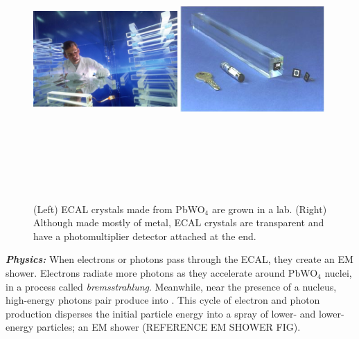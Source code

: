 \begin{figure}[pbth]
    \centering
    \includegraphics[width=0.49\textwidth,height=10cm,keepaspectratio]{figures/cms/ecal/ECAL_crystals_fancy_lab.jpg}
    \includegraphics[width=0.49\textwidth,height=10cm,keepaspectratio]{figures/cms/ecal/ECAL_crystal_sizecomparison.jpg}
    \caption{
        (Left) ECAL crystals made from PbWO$_4$ are grown in a lab.
        (Right) Although made mostly of metal, ECAL crystals are transparent and have a photomultiplier detector attached at the end.} 
    \label{fig:ecal_crystals}
\end{figure}

\textit{\textbf{Physics:}}
When electrons or photons pass through the ECAL, they create an EM shower.
Electrons radiate more photons as they accelerate around PbWO$_4$ nuclei, in a process called \emph{bremsstrahlung}.
Meanwhile, near the presence of a nucleus, high-energy photons pair produce into \ee.
This cycle of electron and photon production disperses the initial particle energy into a spray of lower- and lower-energy particles; an EM shower (REFERENCE EM SHOWER FIG).

